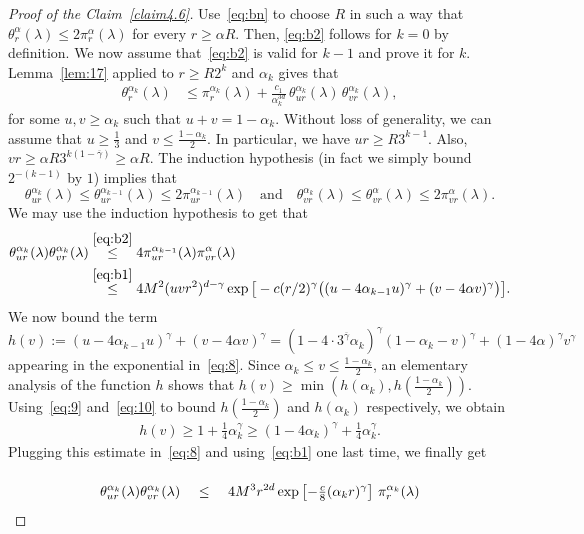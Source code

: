 \documentclass[AHL,Unicode,longabstracts]{cedram}
\begin{document}
\begin{proof}[{Proof of the Claim~\ref{claim4.6}}]
Use~\eqref{eq:bn} to choose $R$ in such a way that $\theta_r^{\alpha}(\lambda)\le 2\pi_r^\alpha(\lambda)$ for every $r\ge \alpha R$. Then, \eqref{eq:b2} follows for $k=0$ by definition. We now assume that~\eqref{eq:b2} is valid for $k-1$ and prove it for $k$. Lemma~\ref{lem:17} applied to $r\ge R2^k$ and $\alpha_k$ gives that
\begin{align}\label{eq:c1}
\theta_{r}^{\alpha_k}(\lambda)&\le \pi_{r}^{\alpha_k}(\lambda)+\frac{c_1}{\alpha_k^{3d}} \,\theta_{ur}^{\alpha_k}(\lambda)\,\theta_{vr}^{\alpha_k}(\lambda),
\end{align}
for some $u,v \ge\alpha_k$ such that $u+v=1-\alpha_k$. Without loss of generality, we can assume that $u \geq \frac 1 3$ and $v\le \frac{1-\alpha_k}2$. In particular, we have $ur\ge R3^{k-1}$. Also, $vr\ge \alpha R3^{k (1-\overline\gamma)}\ge \alpha R$. The induction hypothesis (in fact we simply bound $2^{-{(k-1)}}$ by $1$) implies that
\[
\theta_{ur}^{\alpha_k}(\lambda)\le \theta_{ur}^{\alpha_{k-1}}(\lambda)\le 2\pi_{ur}^{\alpha_{k-1}}(\lambda)\quad \text{and}\quad\theta_{vr}^{\alpha_k}(\lambda)\le \theta_{vr}^{\alpha}(\lambda)\le 2\pi_{vr}^\alpha(\lambda).
\]
We may use the induction hypothesis to get that
\begin{align}
\theta_{ur}^{\alpha_k}(\lambda)\theta_{vr}^{\alpha_k}(\lambda)&\stackrel{\eqref{eq:b2}}\le 4 \pi_{ur}^{\alpha_{k-1}}(\lambda)\pi_{vr}^\alpha(\lambda)\nonumber\\
& \stackrel{\eqref{eq:b1}}\leq 4 M^2 (uvr^2)^{d-\gamma} \exp \big[-c(r/2)^\gamma \big((u - 4\alpha_{k-1}u)^\gamma+(v -4 \alpha v)^\gamma\big)\big] \label{eq:8}
.
\end{align}
We now bound the term
\[
h(v):=(u - 4\alpha_{k-1}u)^\gamma+(v -4 \alpha v)^\gamma{=} (1 - 4\cdot 3^{\overline\gamma}\alpha_{k})^\gamma(1-\alpha_k-v)^\gamma+(1-4 \alpha)^\gamma v^\gamma
\]
appearing in the exponential in~\eqref{eq:8}. Since $\alpha_k\le v\le \frac{1-\alpha_k}2$, an elementary analysis of the function $h$ shows that $h(v) \ge \min (h(\alpha_k),h(\tfrac{1-\alpha_k}2))$. Using~\eqref{eq:9} and~\eqref{eq:10} to bound $h(\frac{1-\alpha_k}2)$ and $h(\alpha_k)$ respectively, we obtain
\begin{align*}
h(v)\ge 1+ \tfrac14 \alpha_k^\gamma \ge(1 - 4\alpha_k)^\gamma +\tfrac14 \alpha_k^\gamma.
\end{align*}
Plugging this estimate in~\eqref{eq:8} and using~\eqref{eq:b1} one last time, we finally get
\begin{align*}
\theta_{ur}^{\alpha_k}(\lambda)\theta_{vr}^{\alpha_k}(\lambda)& \stackrel{\phantom{\eqref{eq:b3}}}\leq 4M^3 r^{2d} \exp \left[-\tfrac c8 (\alpha_kr)^\gamma\right] \, \pi_r^{\alpha_k} (\lambda)\\

\end{align*}
\end{proof}
\end{document}
